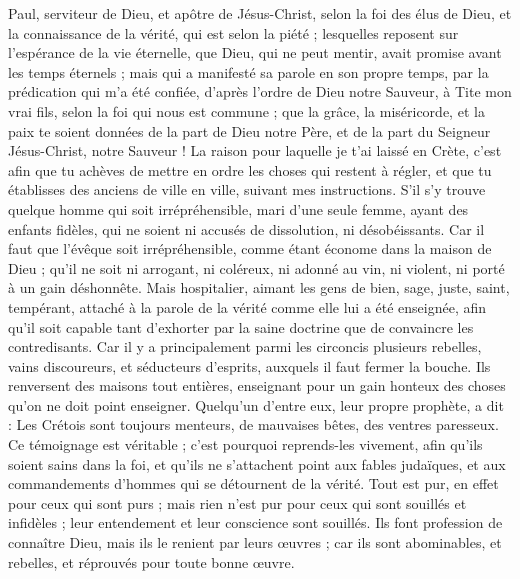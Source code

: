 \begin{multicols}{2}
\TextTitle{[Introduction]}
\VerseOne{}Paul, serviteur de Dieu, et apôtre de Jésus-Christ, selon la foi des élus de Dieu, et la connaissance de la vérité, qui est selon la piété ;
lesquelles reposent sur l'espérance de la vie éternelle, que Dieu, qui ne peut mentir, avait promise avant les temps éternels ;
mais qui a manifesté sa parole en son propre temps, par la prédication qui m’a été confiée, d’après l’ordre de Dieu notre Sauveur,
à Tite mon vrai fils, selon la foi qui nous est commune ; que la grâce, la miséricorde, et la paix te soient données de la part de Dieu notre Père, et de la part du Seigneur Jésus-Christ, notre Sauveur !
La raison pour laquelle je t'ai laissé en Crète, c'est afin que tu achèves de mettre en ordre les choses qui restent à régler, et que tu établisses des anciens de ville en ville, suivant mes instructions.
S’il s’y trouve quelque homme qui soit irrépréhensible, mari d'une seule femme, ayant des enfants fidèles, qui ne soient ni accusés de dissolution, ni désobéissants.
Car il faut que l'évêque soit irrépréhensible, comme étant économe dans la maison de Dieu ; qu’il ne soit ni arrogant, ni coléreux, ni adonné au vin, ni violent, ni porté à un gain déshonnête.
Mais hospitalier, aimant les gens de bien, sage, juste, saint, tempérant,
attaché à la parole de la vérité comme elle lui a été enseignée, afin qu'il soit capable tant d'exhorter par la saine doctrine que de convaincre les contredisants.
Car il y a principalement parmi les circoncis plusieurs rebelles, vains discoureurs, et séducteurs d'esprits,
auxquels il faut fermer la bouche. Ils renversent des maisons tout entières, enseignant pour un gain honteux des choses qu'on ne doit point enseigner.
Quelqu'un d'entre eux, leur propre prophète, a dit : Les Crétois sont toujours menteurs, de mauvaises bêtes, des ventres paresseux.
Ce témoignage est véritable ; c'est pourquoi reprends-les vivement, afin qu'ils soient sains dans la foi,
et qu’ils ne s’attachent point aux fables judaïques, et aux commandements d’hommes qui se détournent de la vérité.
Tout est pur, en effet pour ceux qui sont purs ; mais rien n'est pur pour ceux qui sont souillés et infidèles ; leur entendement et leur conscience sont souillés.
Ils font profession de connaître Dieu, mais ils le renient par leurs œuvres ; car ils sont abominables, et rebelles, et réprouvés pour toute bonne œuvre.

\end{multicols}

